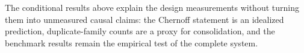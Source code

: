 The conditional results above explain the design measurements without turning them into unmeasured causal claims: the Chernoff statement is an idealized prediction, duplicate-family counts are a proxy for consolidation, and the benchmark results remain the empirical test of the complete system.







